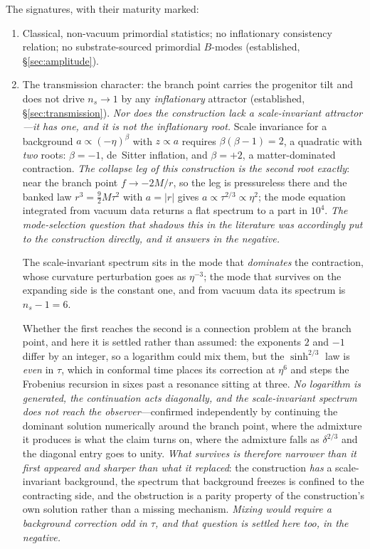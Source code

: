 \documentclass[11pt,a4paper]{article}
\theoremstyle{plain}
\theoremstyle{definition}
\theoremstyle{remark}
\begin{document}
The signatures, with their maturity marked:
\begin{enumerate}
\item Classical, non-vacuum primordial statistics; no inflationary consistency relation; no substrate-sourced primordial $B$-modes (established, \S\ref{sec:amplitude}).
\item The transmission character: the branch point carries the progenitor tilt and does not drive $n_s\to1$ by any \emph{inflationary} attractor (established, \S\ref{sec:transmission}). \emph{Nor does the construction lack a scale-invariant attractor---it has one, and it is not the inflationary root.} Scale invariance for a background $a\propto(-\eta)^{\beta}$ with $z\propto a$ requires $\beta(\beta-1)=2$, a quadratic with \emph{two} roots: $\beta=-1$, de~Sitter inflation, and $\beta=+2$, a matter-dominated contraction. \emph{The collapse leg of this construction is the second root exactly}: near the branch point $f\to-2M/r$, so the leg is pressureless there and the banked law $r^{3}=\tfrac92M\tau^{2}$ with $a=\lvert r\rvert$ gives $a\propto\tau^{2/3}\propto\eta^{2}$; the mode equation integrated from vacuum data returns a flat spectrum to a part in $10^{4}$. \emph{The mode-selection question that shadows this in the literature was accordingly put to the construction directly, and it answers in the negative.} 

The scale-invariant spectrum sits in the mode that \emph{dominates} the contraction, whose curvature perturbation goes as $\eta^{-3}$; the mode that survives on the expanding side is the constant one, and from vacuum data its spectrum is $n_s-1=6$. 

Whether the first reaches the second is a connection problem at the branch point, and here it is settled rather than assumed: the exponents $2$ and $-1$ differ by an integer, so a logarithm could mix them, but the $\sinh^{2/3}$ law is \emph{even} in $\tau$, which in conformal time places its correction at $\eta^{6}$ and steps the Frobenius recursion in sixes past a resonance sitting at three. \emph{No logarithm is generated, the continuation acts diagonally, and the scale-invariant spectrum does not reach the observer}---confirmed independently by continuing the dominant solution numerically around the branch point, where the admixture it produces is what the claim turns on, where the admixture falls as $\delta^{2/3}$ and the diagonal entry goes to unity. \emph{What survives is therefore narrower than it first appeared and sharper than what it replaced}: the construction \emph{has} a scale-invariant background, the spectrum that background freezes is confined to the contracting side, and the obstruction is a parity property of the construction's own solution rather than a missing mechanism. \emph{Mixing would require a background correction odd in $\tau$, and that question is settled here too, in the negative.} 


\end{enumerate}
\end{document}
